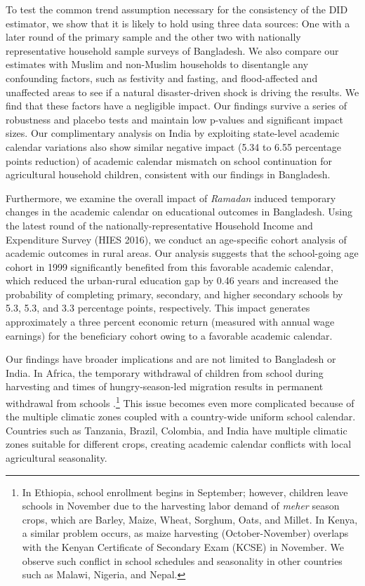 \documentclass[12pt,letterpaper]{article}
\newcommand{\0}{\ensuremath{\mbox{\boldmath $0$}}}
\begin{document}
To test the common trend assumption necessary for the consistency of the DID estimator, we show that it is likely to hold using three data sources: One with a later round of the primary sample and the other two with nationally representative household sample surveys of Bangladesh. We also compare our estimates with Muslim and non-Muslim households to disentangle any confounding factors, such as festivity and fasting, and flood-affected and unaffected areas to see if a natural disaster-driven shock is driving the results. We find that these factors have a negligible impact. Our findings survive a series of robustness and placebo tests and maintain low p-values and significant impact sizes. Our complimentary analysis on India by exploiting state-level academic calendar variations also show similar negative impact (5.34 to 6.55 percentage points reduction) of academic calendar mismatch on school continuation for agricultural household children, consistent with our findings in Bangladesh.

Furthermore, we examine the overall impact of \textit{Ramadan} induced temporary changes in the academic calendar on educational outcomes in Bangladesh. Using the latest round of the nationally-representative Household Income and Expenditure Survey (HIES 2016), we conduct an age-specific cohort analysis of academic outcomes in rural areas. Our analysis suggests that the school-going age cohort in 1999 significantly benefited from this favorable academic calendar, which reduced the urban-rural education gap by 0.46 years and increased the probability of completing primary, secondary, and higher secondary schools by 5.3, 5.3, and 3.3 percentage points, respectively. This impact generates approximately a three percent economic return (measured with annual wage earnings) for the beneficiary cohort owing to a favorable academic calendar.

Our findings have broader implications and are not limited to Bangladesh or India. In Africa, the temporary withdrawal of children from school during harvesting and times of hungry-season-led migration results in permanent withdrawal from schools \citep{ andvig1999child, Colclough2000, Hadley2010, kadzamira2003can, WorldBank1998}.\footnote{In Ethiopia, school enrollment begins in September; however, children leave schools in November due to the harvesting labor demand of \textit{meher} season crops, which are Barley, Maize, Wheat, Sorghum, Oats, and Millet. In Kenya, a similar problem occurs, as maize harvesting (October-November) overlaps with the Kenyan Certificate of Secondary Exam (KCSE) in November. We observe such conflict in school schedules and seasonality in other countries such as Malawi, Nigeria, and Nepal.} This issue becomes even more complicated because of the multiple climatic zones coupled with a country-wide uniform school calendar. Countries such as Tanzania, Brazil, Colombia, and India have multiple climatic zones suitable for different crops, creating academic calendar conflicts with local agricultural seasonality.
\end{document}
